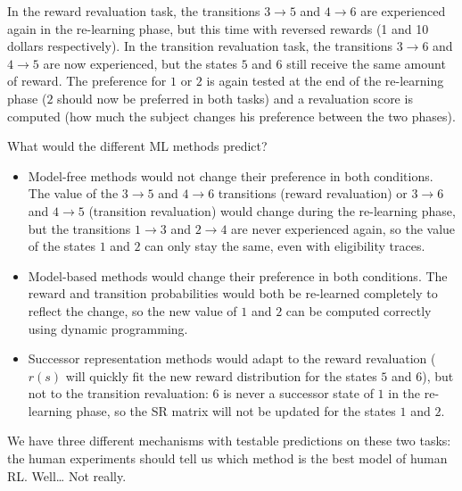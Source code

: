 \documentclass[
  11pt,
]{article}
\begin{document}
In the reward revaluation task, the transitions \(3 \rightarrow 5\) and
\(4 \rightarrow 6\) are experienced again in the re-learning phase, but
this time with reversed rewards (1 and 10 dollars respectively). In the
transition revaluation task, the transitions \(3 \rightarrow 6\) and
\(4 \rightarrow 5\) are now experienced, but the states \(5\) and \(6\)
still receive the same amount of reward. The preference for \(1\) or
\(2\) is again tested at the end of the re-learning phase (\(2\) should
now be preferred in both tasks) and a revaluation score is computed (how
much the subject changes his preference between the two phases).

What would the different ML methods predict?

\begin{itemize}
\item
  Model-free methods would not change their preference in both
  conditions. The value of the \(3 \rightarrow 5\) and
  \(4 \rightarrow 6\) transitions (reward revaluation) or
  \(3 \rightarrow 6\) and \(4 \rightarrow 5\) (transition revaluation)
  would change during the re-learning phase, but the transitions
  \(1 \rightarrow 3\) and \(2 \rightarrow 4\) are never experienced
  again, so the value of the states \(1\) and \(2\) can only stay the
  same, even with eligibility traces.
\item
  Model-based methods would change their preference in both conditions.
  The reward and transition probabilities would both be re-learned
  completely to reflect the change, so the new value of \(1\) and \(2\)
  can be computed correctly using dynamic programming.
\item
  Successor representation methods would adapt to the reward revaluation
  (\(r(s)\) will quickly fit the new reward distribution for the states
  \(5\) and \(6\)), but not to the transition revaluation: \(6\) is
  never a successor state of \(1\) in the re-learning phase, so the SR
  matrix will not be updated for the states \(1\) and \(2\).
\end{itemize}

We have three different mechanisms with testable predictions on these
two tasks: the human experiments should tell us which method is the best
model of human RL. Well\ldots{} Not really.
\end{document}
